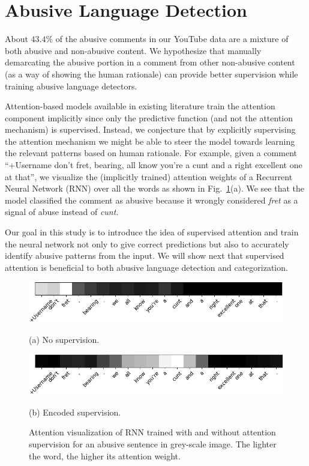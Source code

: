 \documentclass[letterpaper]{article}
\begin{document}
\section{Abusive Language Detection}
\label{sec:detection}
About $43.4\%$ of the abusive comments in our YouTube data are a mixture of both abusive and non-abusive content. We hypothesize that manually demarcating the abusive portion in a comment from other non-abusive content (as a way of showing the human rationale) can provide better supervision while training  abusive language detectors.

Attention-based models available in existing literature train the attention component implicitly since only the predictive function (and not the attention mechanism) is supervised.
Instead, we conjecture that by explicitly supervising the attention mechanism we might be able to steer the model towards learning the relevant patterns based on human rationale. For example, given a comment ``+Username don't fret, bearing, all know you're a cunt and a right excellent one at that'', we visualize the (implicitly trained) attention weights of a Recurrent Neural Network (RNN) over all the words as shown in Fig.~\ref{fig:att_example}(a).
We see that the model classified the comment as abusive because it wrongly considered \textit{fret} as a signal of abuse instead of \textit{cunt}.

Our goal in this study is to introduce the idea of supervised attention  and train the neural network not only to give correct predictions but also to accurately identify abusive patterns from the input. We will show next that supervised attention is beneficial to both abusive language detection and categorization.


\begin{figure}[htbp!]
\captionsetup{font=normalsize}
\centering
\begin{minipage}[c]{0.65\textwidth}
\centerline{\includegraphics[width=\linewidth]{long_comm_no_att.png}}
\centerline{\small{(a) No supervision.}}
\end{minipage}
\begin{minipage}{0.65\textwidth}
\centerline{\includegraphics[width=\linewidth]{long_comm_encoded_att.png}}
\centerline{\small{(b) Encoded supervision.}}
\end{minipage}
\caption{Attention visualization of RNN trained with and without attention supervision for an abusive sentence in grey-scale image. The lighter the word, the higher its attention weight.}
\label{fig:att_example}
\end{figure}
\end{document}
